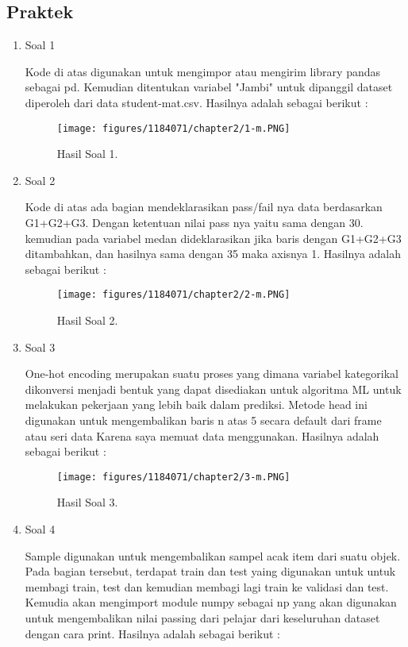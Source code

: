 \subsection{Praktek}
\begin{enumerate}
	\item Soal 1
	\hfill\break
	
	Kode di atas digunakan untuk mengimpor atau mengirim library pandas sebagai pd. Kemudian ditentukan variabel "Jambi" untuk dipanggil dataset diperoleh dari data student-mat.csv. Hasilnya adalah sebagai berikut :
	\begin{figure}[h]
	\centering
		\texttt{[image: figures/1184071/chapter2/1-m.PNG]}
		\caption{Hasil Soal 1.}
	\end{figure}
	\item Soal 2
	\hfill\break
	
	Kode di atas ada bagian mendeklarasikan pass/fail nya data berdasarkan G1+G2+G3. Dengan ketentuan nilai pass nya yaitu sama dengan 30. kemudian pada variabel medan dideklarasikan jika baris dengan G1+G2+G3 ditambahkan, dan hasilnya sama dengan 35 maka axisnya 1. Hasilnya adalah sebagai berikut :
	\begin{figure}[h]
	\centering
		\texttt{[image: figures/1184071/chapter2/2-m.PNG]}
		\caption{Hasil Soal 2.}
	\end{figure}
	\item Soal 3
	\hfill\break
	
	One-hot encoding merupakan suatu proses yang dimana variabel kategorikal dikonversi menjadi bentuk yang dapat disediakan untuk algoritma ML untuk melakukan pekerjaan yang lebih baik dalam prediksi. Metode head ini digunakan untuk mengembalikan baris n atas 5 secara default dari frame atau seri data Karena saya memuat data menggunakan. Hasilnya adalah sebagai berikut :
	\begin{figure}[h]
	\centering
		\texttt{[image: figures/1184071/chapter2/3-m.PNG]}
		\caption{Hasil Soal 3.}
	\end{figure}
	\item Soal 4
	\hfill\break
	
	Sample digunakan untuk mengembalikan sampel acak item dari suatu objek. Pada bagian tersebut, terdapat train dan test yaing digunakan untuk untuk membagi train, test dan kemudian membagi lagi train ke validasi dan test. Kemudia akan mengimport module numpy sebagai np yang akan digunakan untuk mengembalikan nilai passing dari pelajar dari keseluruhan dataset dengan cara print. Hasilnya adalah sebagai berikut :

\end{enumerate}
